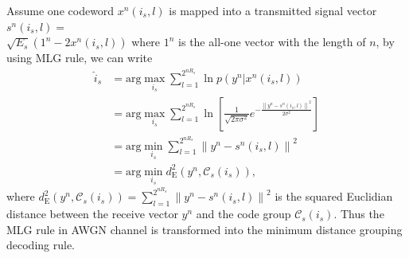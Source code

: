 \documentclass[12pt, draftclsnofoot,onecolumn]{IEEEtran}
\begin{document}
Assume one codeword $x^n(i_s,l)$ is mapped into a transmitted signal vector $s^n(i_s,l)=$\\$\sqrt{E_s}\left(1^n-2x^n(i_s,l)\right)$ where $1^n$ is the all-one vector with the length of $n$, by using MLG rule, we can write
\begin{equation}
\begin{aligned}\label{MLG_rule}
\hat{i}_s &=\text{arg}\max_{i_s} \sum_{l=1}^{2^{nR_s}}\ln p(y^n|x^n(i_s,l)) \\
              &=\text{arg}\max_{i_s} \sum_{l=1}^{2^{nR_s}}\ln \left[\frac{1}{\sqrt{2\pi \sigma^2}} e^{-\frac{\left\|y^n-s^n(i_s,l)\right\|^2}{2\sigma^2}}\right]\\
              &=\text{arg}\min_{i_s} \sum_{l=1}^{2^{nR_s}} \left\|y^n-s^n(i_s,l)\right\|^2\\
              &=\text{arg}\min_{i_s} d_{\text{E}}^2 \left(y^n, \mathcal{C}_s(i_s)\right),
\end{aligned}
\end{equation}
where $d_{\text{E}}^2 \left(y^n, \mathcal{C}_s(i_s)\right)=\sum_{l=1}^{2^{nR_s}} \left\|y^n-s^n(i_s,l)\right\|^2$ is the squared Euclidian distance between the receive vector $y^n$ and the code group $\mathcal{C}_s(i_s)$. Thus the MLG rule in AWGN channel is transformed into the minimum distance grouping decoding rule.
\end{document}
